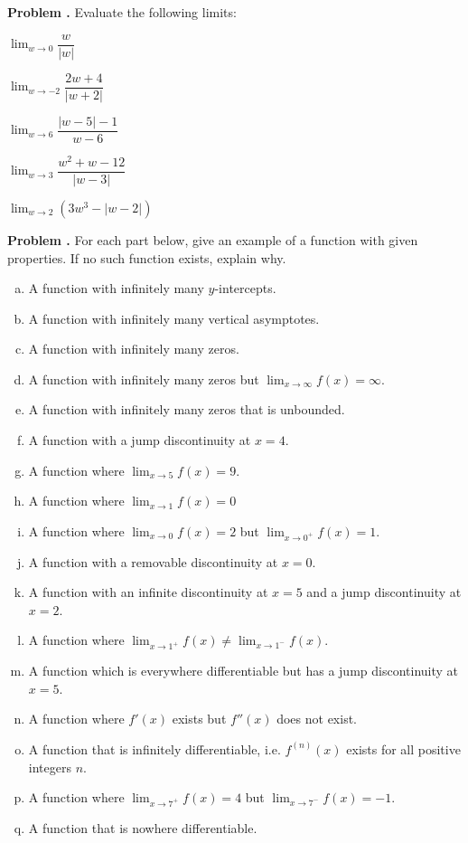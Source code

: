 \documentclass[11pt,letterpaper]{article}
\newenvironment{2enumerate}{%
	\begin{enumerate}[(a)]
	\begin{multicols}{2}
	}{%
	\end{multicols}
	\end{enumerate}
}
\newcommand{\ds}{\displaystyle}
\newcounter{problem}
\newcommand{\prob}{\stepcounter{problem}%
\noindent\textbf{Problem \theproblem. }}
\begin{document}
\prob Evaluate the following limits:
	\begin{2enumerate}
        \item $\ds\lim_{w \to 0} \dfrac{w}{|w|}$
        \item $\ds\lim_{w \to -2} \dfrac{2w+4}{|w+2|}$
        \item $\ds\lim_{w \to 6} \dfrac{|w-5|-1}{w-6}$
        \item $\ds\lim_{w \to 3} \dfrac{w^2+w-12}{|w-3|}$
        \item $\ds\lim_{w \to 2} \left(3w^3 - |w-2|\right)$ \\
        \end{2enumerate}



\prob For each part below, give an example of a function with given properties. If no such function exists, explain why.
	\begin{enumerate}[(a)]
	\item A function with infinitely many $y$-intercepts. 
	\item A function with infinitely many vertical asymptotes. 
	\item A function with infinitely many zeros.
	\item A function with infinitely many zeros but $\ds\lim_{x \to \infty} f(x)= \infty$.
	\item A function with infinitely many zeros that is unbounded. 
	\item A function with a jump discontinuity at $x= 4$.
	\item A function where $\ds\lim_{x \to 5} f(x)= 9$.
	\item A function where $\ds\lim_{x \to 1} f(x)= 0$
	\item A function where $\ds\lim_{x \to 0} f(x)= 2$ but $\ds\lim_{x \to 0^+} f(x)= 1$.
	\item A function with a removable discontinuity at $x= 0$.
	\item A function with an infinite discontinuity at $x= 5$ and a jump discontinuity at $x= 2$.
	\item A function where $\ds\lim_{x \to 1^+} f(x) \neq \ds\lim_{x \to 1^-} f(x)$. 
	\item A function which is everywhere differentiable but has a jump discontinuity at $x= 5$. 
	\item A function where $f'(x)$ exists but $f''(x)$ does not exist. 
	\item A function that is infinitely differentiable, i.e. $f^{(n)}(x)$ exists for all positive integers $n$.
	\item A function where $\ds\lim_{x \to 7^+} f(x)= 4$  but $\ds\lim_{x \to 7^-} f(x)= -1$. 
	\item A function that is nowhere differentiable. 
	\end{enumerate}
\end{document}
